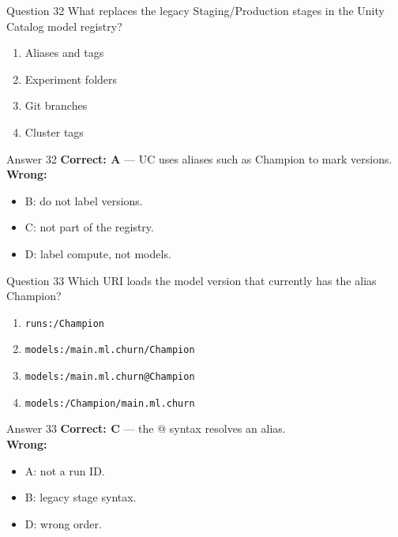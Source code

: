 \documentclass[aspectratio=169,11pt]{beamer}
\begin{document}
	\begin{frame}{Question 32}
		What replaces the legacy Staging/Production stages in the Unity Catalog model registry?
		\begin{enumerate}[label=\Alph*.]
			\item Aliases and tags
			\item Experiment folders
			\item Git branches
			\item Cluster tags
		\end{enumerate}
	\end{frame}
	\begin{frame}{Answer 32}
		\textbf{Correct: A} --- UC uses aliases such as Champion to mark versions.\\
		\vspace{0.5em}
		\textbf{Wrong:}
		\begin{itemize}
			\item B: do not label versions.
			\item C: not part of the registry.
			\item D: label compute, not models.
		\end{itemize}
	\end{frame}
	
	\begin{frame}{Question 33}
		Which URI loads the model version that currently has the alias Champion?
		\begin{enumerate}[label=\Alph*.]
			\item \texttt{runs:/Champion}
			\item \texttt{models:/main.ml.churn/Champion}
			\item \texttt{models:/main.ml.churn@Champion}
			\item \texttt{models:/Champion/main.ml.churn}
		\end{enumerate}
	\end{frame}
	\begin{frame}{Answer 33}
		\textbf{Correct: C} --- the @ syntax resolves an alias.\\
		\vspace{0.5em}
		\textbf{Wrong:}
		\begin{itemize}
			\item A: not a run ID.
			\item B: legacy stage syntax.
			\item D: wrong order.
		\end{itemize}
	\end{frame}
	
\end{document}
